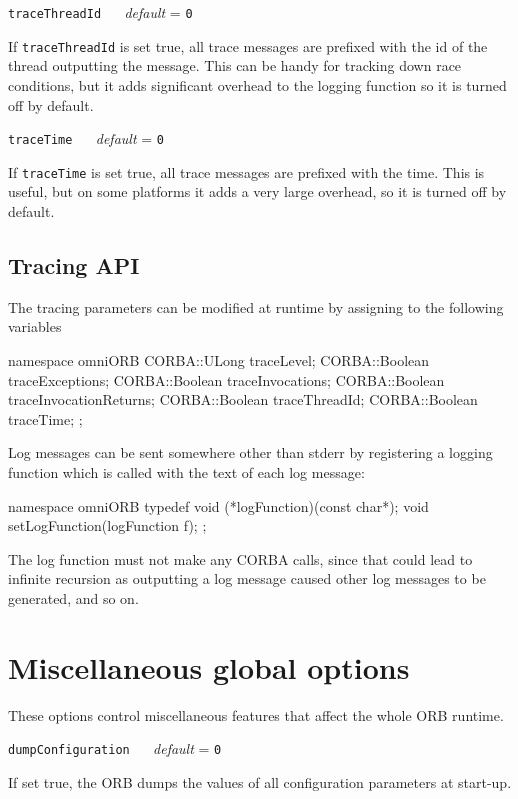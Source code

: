 \documentclass[11pt,twoside,a4paper]{book}
\makeatletter
\newcommand{\code}[1]{\texttt{#1}}
\newcommand{\confopt}[2]
  {\vspace{\baselineskip}\par\noindent\code{#1} ~~ \textit{default} =
   \code{#2}}
\renewcommand{\confopt}[2]
  {\vspace{\baselineskip}\par\noindent\code{#1} ~~ \textit{default} =
   \code{#2}\\[-1ex]\@afterheading}
\makeatother
\begin{document}
\confopt{traceThreadId}{0}

If \code{traceThreadId} is set true, all trace messages are prefixed
with the id of the thread outputting the message. This can be handy
for tracking down race conditions, but it adds significant overhead to
the logging function so it is turned off by default.


\confopt{traceTime}{0}

If \code{traceTime} is set true, all trace messages are prefixed with
the time. This is useful, but on some platforms it adds a very large
overhead, so it is turned off by default.



\subsection{Tracing API}

The tracing parameters can be modified at runtime by assigning to the
following variables

\begin{cxxlisting}
namespace omniORB {
  CORBA::ULong   traceLevel;
  CORBA::Boolean traceExceptions;
  CORBA::Boolean traceInvocations;
  CORBA::Boolean traceInvocationReturns;
  CORBA::Boolean traceThreadId;
  CORBA::Boolean traceTime;
};
\end{cxxlisting}

\noindent
Log messages can be sent somewhere other than stderr by registering a
logging function which is called with the text of each log message:

\begin{cxxlisting}
namespace omniORB {
  typedef void (*logFunction)(const char*);
  void setLogFunction(logFunction f);
};
\end{cxxlisting}

\noindent
The log function must not make any CORBA calls, since that could lead
to infinite recursion as outputting a log message caused other log
messages to be generated, and so on.




\section{Miscellaneous global options}

These options control miscellaneous features that affect the whole ORB
runtime.

\confopt{dumpConfiguration}{0}

If set true, the ORB dumps the values of all configuration parameters
at start-up.
\end{document}
